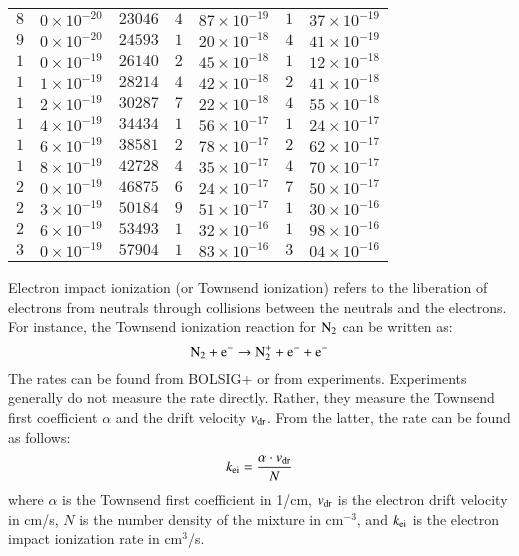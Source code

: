 \documentclass{warpdoc}
\begin{document}
\begin{table}
\begin{threeparttable}
\begin{tabular}{r@{.}lrr@{.}lr@{.}l}
$8$&$0\times 10^{-20} $&$ 23046 $&$  4$&$87\times 10^{-19} $&$ 1$&$37\times 10^{-19}$ \\ 
$9$&$0\times 10^{-20} $&$ 24593 $&$  1$&$20\times 10^{-18} $&$ 4$&$41\times 10^{-19}$ \\[0.5em] 
$1$&$0\times 10^{-19} $&$ 26140 $&$  2$&$45\times 10^{-18} $&$ 1$&$12\times 10^{-18}$ \\ 
$1$&$1\times 10^{-19} $&$ 28214 $&$  4$&$42\times 10^{-18} $&$ 2$&$41\times 10^{-18}$ \\ 
$1$&$2\times 10^{-19} $&$ 30287 $&$  7$&$22\times 10^{-18} $&$ 4$&$55\times 10^{-18}$ \\ 
$1$&$4\times 10^{-19} $&$ 34434 $&$  1$&$56\times 10^{-17} $&$ 1$&$24\times 10^{-17}$ \\[0.5em] 
$1$&$6\times 10^{-19} $&$ 38581 $&$  2$&$78\times 10^{-17} $&$ 2$&$62\times 10^{-17}$ \\ 
$1$&$8\times 10^{-19} $&$ 42728 $&$  4$&$35\times 10^{-17} $&$ 4$&$70\times 10^{-17}$ \\ 
$2$&$0\times 10^{-19} $&$ 46875 $&$  6$&$24\times 10^{-17} $&$ 7$&$50\times 10^{-17}$ \\ 
$2$&$3\times 10^{-19} $&$ 50184 $&$  9$&$51\times 10^{-17} $&$ 1$&$30\times 10^{-16}$ \\[0.5em] 
$2$&$6\times 10^{-19} $&$ 53493 $&$  1$&$32\times 10^{-16} $&$ 1$&$98\times 10^{-16}$ \\ 
$3$&$0\times 10^{-19} $&$ 57904 $&$  1$&$83\times 10^{-16} $&$ 3$&$04\times 10^{-16}$ \\ 
    \bottomrule   
    \end{tabular}
   \end{threeparttable}
   \label{tab:electronimpactionization_N2}
\end{table}
%

Electron impact ionization (or Townsend ionization) refers to the liberation of electrons from neutrals through collisions between the neutrals and the electrons. For instance, the Townsend ionization reaction for $\rm N_2$ can be written as:
%
\begin{equation}
 \rm N_2 + e^- \rightarrow N_2^+ + e^- + e^-
\end{equation}
%
The rates can be found from BOLSIG+ or from experiments. Experiments generally do not measure the rate directly. Rather, they measure the Townsend first coefficient $\alpha$ and the drift velocity $v_{\rm dr}$. From the latter, the rate can be found as follows:
%
\begin{equation}
k_{\rm ei}=\frac{\alpha \cdot v_{\rm dr}}{N}   
\end{equation}
%
where $\alpha$ is the Townsend first coefficient in 1/cm, $v_{\rm dr}$ is the electron drift velocity in cm/s, $N$ is the number density of the mixture in cm$^{-3}$, and $k_{\rm ei}$ is the electron impact ionization rate in cm$^3$/s.
\end{document}
